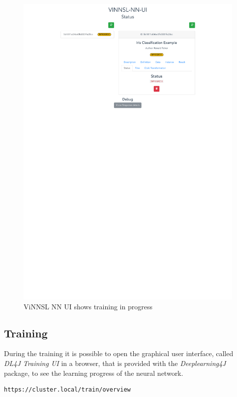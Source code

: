 \begin{figure}
\centering
\includegraphics{images/usecase_1_ui-training}
\caption{ViNNSL NN UI shows training in progress
\label{usecase_1_ui-training}}
\end{figure}

\subsection{Training}\label{training}

During the training it is possible to open the graphical user interface,
called \emph{DL4J Training UI} in a browser, that is provided with the
\emph{Deeplearning4J} package, to see the learning progress of the
neural network.

\begin{verbatim}
https://cluster.local/train/overview
\end{verbatim}


